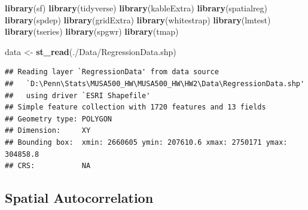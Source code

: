 \documentclass[
]{article}
\newenvironment{Shaded}{\begin{snugshade}}{\end{snugshade}}
\newcommand{\AttributeTok}[1]{\textcolor[rgb]{0.13,0.29,0.53}{#1}}
\newcommand{\FunctionTok}[1]{\textcolor[rgb]{0.13,0.29,0.53}{\textbf{#1}}}
\newcommand{\NormalTok}[1]{#1}
\newcommand{\OtherTok}[1]{\textcolor[rgb]{0.56,0.35,0.01}{#1}}
\newcommand{\SpecialCharTok}[1]{\textcolor[rgb]{0.81,0.36,0.00}{\textbf{#1}}}
\newcommand{\StringTok}[1]{\textcolor[rgb]{0.31,0.60,0.02}{#1}}
\begin{document}
\begin{Shaded}
\begin{Highlighting}[]
\FunctionTok{library}\NormalTok{(sf)}
\FunctionTok{library}\NormalTok{(tidyverse)}
\FunctionTok{library}\NormalTok{(kableExtra)}
\FunctionTok{library}\NormalTok{(spatialreg)}
\FunctionTok{library}\NormalTok{(spdep)}
\FunctionTok{library}\NormalTok{(gridExtra)}
\FunctionTok{library}\NormalTok{(whitestrap)}
\FunctionTok{library}\NormalTok{(lmtest)}
\FunctionTok{library}\NormalTok{(tseries)}
\FunctionTok{library}\NormalTok{(spgwr)}
\FunctionTok{library}\NormalTok{(tmap)}
\end{Highlighting}
\end{Shaded}

\begin{Shaded}
\begin{Highlighting}[]
\NormalTok{data }\OtherTok{\textless{}{-}} \FunctionTok{st\_read}\NormalTok{(}\StringTok{\textquotesingle{}./Data/RegressionData.shp\textquotesingle{}}\NormalTok{)}
\end{Highlighting}
\end{Shaded}

\begin{verbatim}
## Reading layer `RegressionData' from data source 
##   `D:\Penn\Stats\MUSA500_HW\MUSA500_HW\HW2\Data\RegressionData.shp' 
##   using driver `ESRI Shapefile'
## Simple feature collection with 1720 features and 13 fields
## Geometry type: POLYGON
## Dimension:     XY
## Bounding box:  xmin: 2660605 ymin: 207610.6 xmax: 2750171 ymax: 304858.8
## CRS:           NA
\end{verbatim}

\begin{Shaded}
\end{Shaded}

\hypertarget{spatial-autocorrelation}{%
\subsection{Spatial Autocorrelation}\label{spatial-autocorrelation}}
\end{document}
